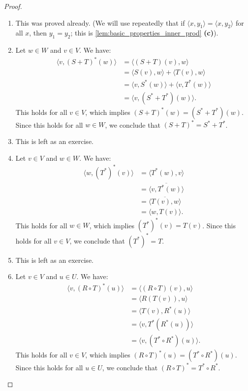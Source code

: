 \begin{proof}
\begin{enumerate}[label=\textbf{(\alph*)}]
    \item This was proved already. (We will use repeatedly that if $\langle x, y_1 \rangle = \langle x, y_2 \rangle$ for all $x$, then $y_1 = y_2$; this is \cref{lem:basic_properties_inner_prod} \textbf{(c)}).
    \item Let $w \in W$ and $v \in V$. We have:
    \begin{align*}
        \langle v, (S+T)^*(w) \rangle &= \langle (S+T)(v), w \rangle \\
        &= \langle S(v), w \rangle + \langle T(v), w \rangle \\
        &= \langle v, S^*(w) \rangle + \langle v, T^*(w) \rangle \\
        &= \langle v, (S^*+T^*)(w) \rangle.
    \end{align*}
    This holds for all $v \in V$, which implies $(S+T)^*(w) = (S^*+T^*)(w)$. Since this holds for all $w \in W$, we conclude that $(S+T)^* = S^* + T^*$.
    \item This is left as an exercise.
    \item Let $v \in V$ and $w \in W$. We have:
    \begin{align*}
        \langle w, (T^*)^*(v) \rangle &= \langle T^*(w), v \rangle \\
        &= \overline{\langle v, T^*(w) \rangle} \\
        &= \overline{\langle T(v), w \rangle} \\
        &= \langle w, T(v) \rangle.
    \end{align*}
    This holds for all $w \in W$, which implies $(T^*)^*(v) = T(v)$. Since this holds for all $v \in V$, we conclude that $(T^*)^* = T$.
    \item This is left as an exercise.
    \item Let $v \in V$ and $u \in U$. We have:
    \begin{align*}
        \langle v, (R \circ T)^*(u) \rangle &= \langle (R \circ T)(v), u \rangle \\
        &= \langle R(T(v)), u \rangle \\
        &= \langle T(v), R^*(u) \rangle \\
        &= \langle v, T^*(R^*(u)) \rangle \\
        &= \langle v, (T^* \circ R^*)(u) \rangle.
    \end{align*}
    This holds for all $v \in V$, which implies $(R \circ T)^*(u) = (T^* \circ R^*)(u)$. Since this holds for all $u \in U$, we conclude that $(R \circ T)^* = T^* \circ R^*$.
\end{enumerate}
\end{proof}

